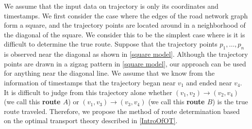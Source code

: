 \documentclass{article}
\numberwithin{equation}{section}
\theoremstyle{definition}
\begin{document}
We assume that the input data on trajectory is only its coordinates and timestamps.
We first consider the case where the edges of the road network graph form a square, and the trajectory points are located around in a neighborhood of the diagonal of the square.  We consider this to be the simplest case where is it is difficult to determine the true route. 
Suppose that the trajectory points $p_1,\ldots,p_n$ is observed near the diagonal as shown in \autoref{square model}.
Although the trajectory points are drawn in a zigzag pattern in \autoref{square model}, our approach can be used for anything near the diagonal line.
We assume that we know from the information of timestamps that the trajectory began near $v_1$ and ended near $v_4$.
It is difficult to judge from this trajectory alone whether $(v_1,v_2)\to(v_2,v_4)$ (we call this \textbf{route $A$}) or $(v_1,v_3)\to(v_3 ,v_4)$ (we call this \textbf{route $B$}) is the true route traveled.
Therefore, we propose the method of route determination based on the optimal transport theory described in \autoref{IntroOfOT}.
\end{document}

